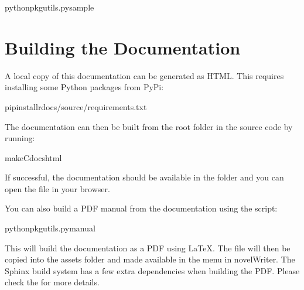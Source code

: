 \documentclass[a4paper,11pt,english]{sphinxmanual}
\begin{document}
\begin{sphinxVerbatim}[commandchars=\\\{\}]
pythonpkgutils.pysample
\end{sphinxVerbatim}


\section{Building the Documentation}
\label{\detokenize{tech_source:building-the-documentation}}\label{\detokenize{tech_source:a-source-docs}}
\sphinxAtStartPar
A local copy of this documentation can be generated as HTML. This requires installing some Python
packages from PyPi:

\begin{sphinxVerbatim}[commandchars=\\\{\}]
pipinstall\PYGZhy{}rdocs/source/requirements.txt
\end{sphinxVerbatim}

\sphinxAtStartPar
The documentation can then be built from the root folder in the source code by running:

\begin{sphinxVerbatim}[commandchars=\\\{\}]
make\PYGZhy{}Cdocshtml
\end{sphinxVerbatim}

\sphinxAtStartPar
If successful, the documentation should be available in the  folder and you can
open the  file in your browser.

\sphinxAtStartPar
You can also build a PDF manual from the documentation using the  script:

\begin{sphinxVerbatim}[commandchars=\\\{\}]
pythonpkgutils.pymanual
\end{sphinxVerbatim}

\sphinxAtStartPar
This will build the documentation as a PDF using LaTeX. The file will then be copied into the
assets folder and made available in the  menu in novelWriter. The Sphinx build system has a
few extra dependencies when building the PDF. Please check the  for more details.

\sphinxstepscope
\end{document}
